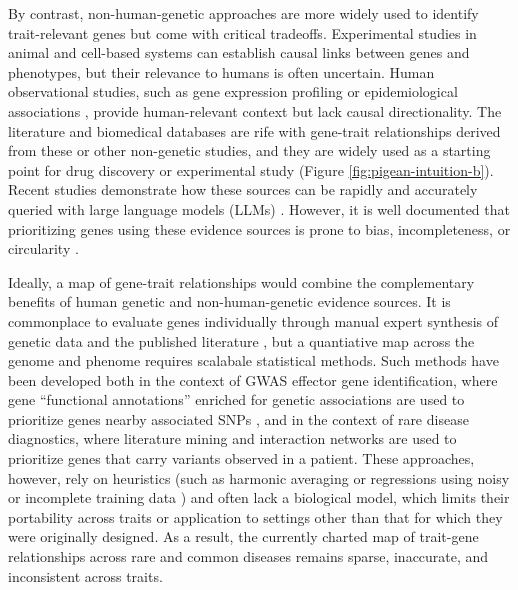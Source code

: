 By contrast, non-human-genetic approaches are more widely used to identify trait-relevant genes but come with critical tradeoffs. Experimental studies in animal \cite{seok_genomic_2013,widjaja_inhibiting_2019} and cell-based \cite{ben-david_genetic_2018,canon_clinical_2019} systems can establish causal links between genes and phenotypes, but their relevance to humans is often uncertain. Human observational studies, such as gene expression profiling \cite{wu_integrating_2022,rodriguez_machine_2021} or epidemiological associations \cite{barter_cholesteryl_2011,bhatt_cardiovascular_2019}, provide human-relevant context but lack causal directionality. The literature and biomedical databases are rife with gene-trait relationships derived from these or other non-genetic studies, and they are widely used as a starting point for drug discovery or experimental study \cite{swinney_how_2011,dornbos_evaluating_2022} (Figure \ref{fig:pigean-intuition-b}). Recent studies demonstrate how these sources can be rapidly and accurately queried with large language models (LLMs) \cite{toufiq_harnessing_2023,hu_evaluation_2025}. However, it is well documented that prioritizing genes using these evidence sources is prone to bias, incompleteness, or circularity \cite{brito_removing_2011,gillis_assessing_2013,gaudet_removing_2017,dunham_human_2018,haynes_gene_2018,stoeger_large_2018,richardson_meta_2024,tan_caution_2025}.

Ideally, a map of gene-trait relationships would combine the complementary benefits of human genetic and non-human-genetic evidence sources. It is commonplace to evaluate genes individually through manual expert synthesis of genetic data and the published literature \cite{mountjoy_open_2022,karjalainen_genome-wide_2024}, but a quantiative map across the genome and phenome requires scalabale statistical methods. Such methods have been developed both in the context of GWAS effector gene identification, where gene ``functional annotations'' enriched for genetic associations are used to prioritize genes nearby associated SNPs \cite{pers_biological_2015,weeks_leveraging_2023}, and in the context of rare disease diagnostics, where literature mining \cite{birgmeier_amelie_2020} and interaction networks \cite{smedley_next-generation_2015} are used to prioritize genes that carry variants observed in a patient. These approaches, however, rely on heuristics (such as harmonic averaging \cite{buniello_open_2025} or regressions using noisy or incomplete training data \cite{weeks_leveraging_2023,schipper_prioritizing_2025}) and often lack a biological model, which limits their portability across traits or application to settings other than that for which they were originally designed. As a result, the currently charted map of trait-gene relationships across rare and common diseases remains sparse, inaccurate, and inconsistent across traits.

